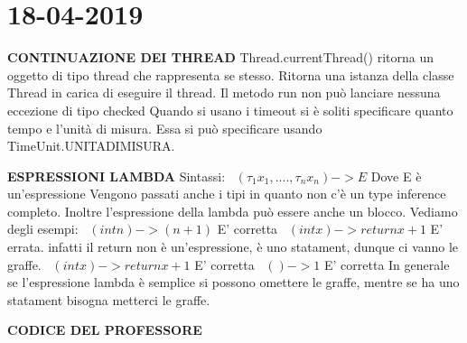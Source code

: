 

\newpage
\section{18-04-2019}
\noindent \textbf{CONTINUAZIONE DEI THREAD} \newline
Thread.currentThread() ritorna un oggetto di tipo thread che rappresenta se stesso. Ritorna una istanza della classe Thread in carica di eseguire il thread. \newline
Il metodo run non può lanciare nessuna eccezione di tipo checked \newline
Quando si usano i timeout si è soliti specificare quanto tempo e l'unità di misura. Essa si può specificare usando TimeUnit.UNITADIMISURA. \newline

\noindent \textbf{ESPRESSIONI LAMBDA} \newline
Sintassi: \newline
\textbullet\ $ (\tau_{1} x_{1} , .... , \tau_{n} x_{n}) -> E $ Dove E è un'espressione \newline
Vengono passati anche i tipi in quanto non c'è un type inference completo. Inoltre l'espressione della lambda può essere anche un blocco. \newline
Vediamo degli esempi: \newline
\textbullet\ $ (int n) -> (n+1) $ E' corretta \newline
\textbullet\ $ (int x) -> return x+1 $ E' errata. infatti il return non è un'espressione, è uno statament, dunque ci vanno le graffe. \newline
\textbullet\ $ (int x) -> {return x+1} $ E' corretta \newline
\textbullet\ $ () -> 1 $ E' corretta \newline
In generale se l'espressione lambda è semplice si possono omettere le graffe, mentre se ha uno statament bisogna metterci le graffe. \newline


\noindent \textbf{CODICE DEL PROFESSORE} \newline

 


